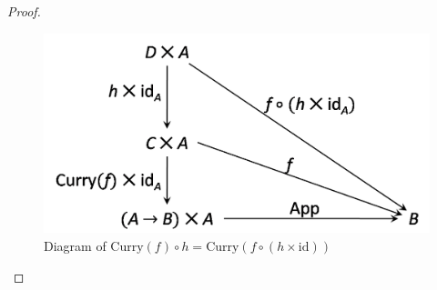 \begin{proof}
\begin{figure}[h!]
\label{figure:cat_eqn2}
\end{figure}
\begin{figure}[h!]
\centering
\includegraphics[scale=0.48]{./images/cat_eqn3}
\caption{Diagram of $ \text{Curry}(f) \circ h = \text{Curry}(f \circ (h \times \text{id})) $}
\label{figure:cat_eqn3}
\end{figure}


\end{proof}
